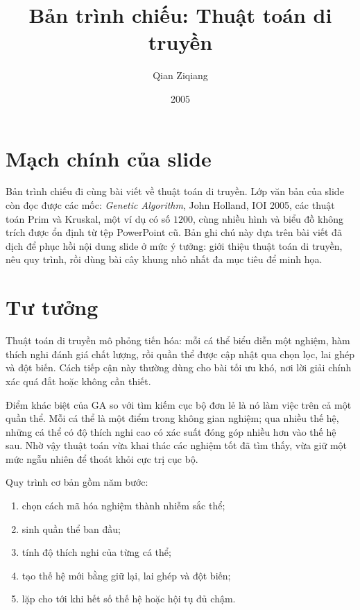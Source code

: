 \documentclass[11pt]{article}
\title{Bản trình chiếu: Thuật toán di truyền}
\author{Qian Ziqiang}
\date{2005}
\newcommand{\GA}{\ensuremath{\mathrm{GA}}}
\begin{document}
\maketitle


\section{Mạch chính của slide}

Bản trình chiếu đi cùng bài viết về thuật toán di truyền. Lớp văn bản của
slide còn đọc được các mốc: \textit{Genetic Algorithm}, John Holland,
IOI 2005, các thuật toán Prim và Kruskal, một ví dụ có số \(1200\), cùng
nhiều hình và biểu đồ không trích được ổn định từ tệp PowerPoint cũ. Bản ghi
chú này dựa trên bài viết đã dịch để phục hồi nội dung slide ở mức ý tưởng:
giới thiệu thuật toán di truyền, nêu quy trình, rồi dùng bài cây khung nhỏ
nhất đa mục tiêu để minh họa.

\section{Tư tưởng}

Thuật toán di truyền mô phỏng tiến hóa: mỗi cá thể biểu diễn một nghiệm, hàm
thích nghi đánh giá chất lượng, rồi quần thể được cập nhật qua chọn lọc, lai
ghép và đột biến. Cách tiếp cận này thường dùng cho bài tối ưu khó, nơi lời
giải chính xác quá đắt hoặc không cần thiết.

Điểm khác biệt của \GA{} so với tìm kiếm cục bộ đơn lẻ là nó làm việc trên
cả một quần thể. Mỗi cá thể là một điểm trong không gian nghiệm; qua nhiều
thế hệ, những cá thể có độ thích nghi cao có xác suất đóng góp nhiều hơn vào
thế hệ sau. Nhờ vậy thuật toán vừa khai thác các nghiệm tốt đã tìm thấy, vừa
giữ một mức ngẫu nhiên để thoát khỏi cực trị cục bộ.

Quy trình cơ bản gồm năm bước:
\begin{enumerate}
  \item chọn cách mã hóa nghiệm thành nhiễm sắc thể;
  \item sinh quần thể ban đầu;
  \item tính độ thích nghi của từng cá thể;
  \item tạo thế hệ mới bằng giữ lại, lai ghép và đột biến;
  \item lặp cho tới khi hết số thế hệ hoặc hội tụ đủ chậm.
\end{enumerate}
\end{document}
